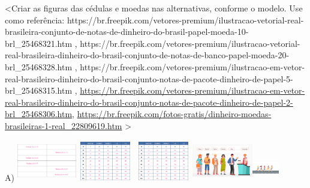 \textless{}Criar as figuras das cédulas e moedas nas alternativas,
conforme o modelo. Use como referência:
https://br.freepik.com/vetores-premium/ilustracao-vetorial-real-brasileira-conjunto-de-notas-de-dinheiro-do-brasil-papel-moeda-10-brl\_25468321.htm
,
https://br.freepik.com/vetores-premium/ilustracao-vetorial-real-brasileira-dinheiro-do-brasil-conjunto-de-notas-de-banco-papel-moeda-20-brl\_25468328.htm
,
https://br.freepik.com/vetores-premium/ilustracao-em-vetor-real-brasileiro-dinheiro-do-brasil-conjunto-notas-de-pacote-dinheiro-de-papel-5-brl\_25468315.htm
,
\url{https://br.freepik.com/vetores-premium/ilustracao-em-vetor-real-brasileiro-dinheiro-do-brasil-conjunto-notas-de-pacote-dinheiro-de-papel-2-brl_25468306.htm},
\url{https://br.freepik.com/fotos-gratis/dinheiro-moedas-brasileiras-1-real_22809619.htm}
\textgreater{}

A)
\includegraphics[width=1.02736in,height=0.68704in]{media/image110.png}\includegraphics[width=1.01042in,height=0.67572in]{media/image111.png}\includegraphics[width=1.01042in,height=0.67572in]{media/image111.png}\includegraphics[width=1.04264in,height=0.69727in]{media/image113.png}\includegraphics[width=0.45621in,height=0.44100in]{media/image138.png}

